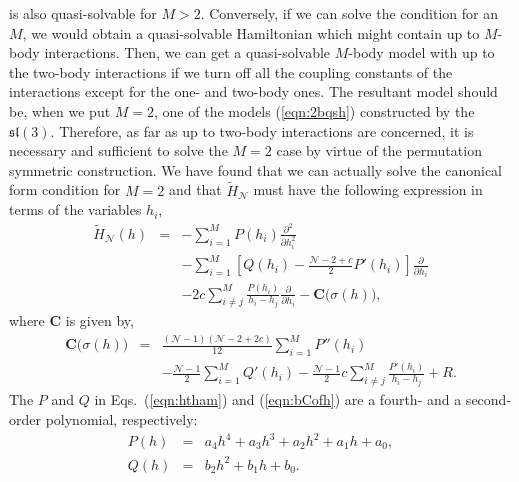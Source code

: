 \documentclass[a4paper,preprint,amsfonts,amssymb,amsmath,%
tightenlines,nofootinbib,noshowpacs]{revtex4}
\newcommand{\cN}{\mathcal{N}}
\newcommand{\bC}{\boldsymbol{C}}
\newcommand{\Lsl}{\mathfrak{sl}}
\begin{document}
is also quasi-solvable for $M>2$. Conversely,
if we can solve the condition for an $M$, we would obtain
a quasi-solvable Hamiltonian which might contain up to $M$-body
interactions.
Then, we can get a quasi-solvable $M$-body model with up to
the two-body interactions if we turn off all the coupling constants
of the interactions except for the one- and two-body ones.
The resultant model should be, when we put $M=2$, one of the
models (\ref{eqn:2bqsh}) constructed by the $\Lsl(3)$.
Therefore, as far as up to two-body interactions are concerned,
it is necessary and sufficient to solve the $M=2$ case by virtue
of the permutation symmetric construction. We have found that
we can actually solve the canonical form condition for $M=2$
and that $\tilde{H}_{\cN}$ must have the
following expression in terms of the variables $h_{i}$,
\begin{eqnarray}
\tilde{H}_{\cN}(h)&=&-\sum_{i=1}^{M}P(h_{i})\frac{\partial^{2}}%
{\partial h_{i}^{2}}\nonumber\\
&&-\sum_{i=1}^{M}\left[Q(h_{i})-\frac{\cN-2+c}{2}P'(h_{i})\right]
\frac{\partial}{\partial h_{i}}\nonumber\\
&&-2c\sum_{i\neq j}^{M}\frac{P(h_{i})}{h_{i}-h_{j}}\frac{\partial}%
{\partial h_{i}}-\bC\bigl(\sigma(h)\bigr),
\label{eqn:htham}
\end{eqnarray}
where $\bC$ is given by,
\begin{eqnarray}
\bC\bigl(\sigma(h)\bigr)&=&
\frac{(\cN -1)(\cN -2+2c)}{12}\sum_{i=1}^{M}P''(h_{i})
\nonumber\\
&&-\frac{\cN -1}{2}\sum_{i=1}^{M}Q'(h_{i})
-\frac{\cN -1}{2}c\sum_{i\neq j}^{M}\frac{P'(h_{i})}{h_{i}-h_{j}}+R.
\label{eqn:bCofh}
\end{eqnarray}
The $P$ and $Q$ in Eqs.~(\ref{eqn:htham}) and (\ref{eqn:bCofh})
are a fourth- and a second-order polynomial, respectively:
\begin{subequations}
\label{eqns:defpol}
\begin{eqnarray}
P(h)&=&a_{4}h^{4}+a_{3}h^{3}+a_{2}h^{2}+a_{1}h+a_{0},
\label{eqn:defP}\\
Q(h)&=&b_{2}h^{2}+b_{1}h+b_{0}.
\label{eqn:defQ}
\end{eqnarray}
\end{subequations}
\end{document}
